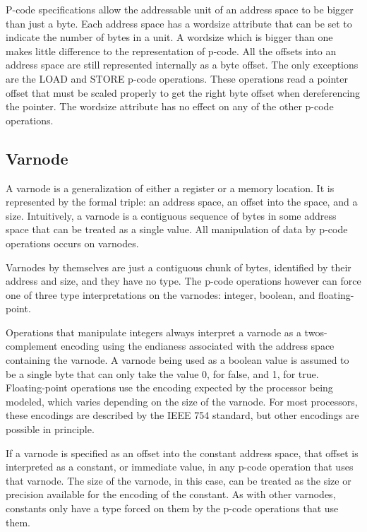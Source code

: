 P-code specifications allow the addressable unit of an address space to be bigger than just a byte. Each address space has a wordsize attribute that can be set to indicate the number of bytes in a unit. A wordsize which is bigger than one makes little difference to the representation of p-code. All the offsets into an address space are still represented internally as a byte offset. The only exceptions are the LOAD and STORE p-code operations. These operations read a pointer offset that must be scaled properly to get the right byte offset when dereferencing the pointer. The wordsize attribute has no effect on any of the other p-code operations. 

\subsection{Varnode}
A varnode is a generalization of either a register or a memory location. It is represented by the formal triple: an address space, an offset into the space, and a size. Intuitively, a varnode is a contiguous sequence of bytes in some address space that can be treated as a single value. All manipulation of data by p-code operations occurs on varnodes.

Varnodes by themselves are just a contiguous chunk of bytes, identified by their address and size, and they have no type. The p-code operations however can force one of three type interpretations on the varnodes: integer, boolean, and floating-point.

Operations that manipulate integers always interpret a varnode as a twos-complement encoding using the endianess associated with the address space containing the varnode.
A varnode being used as a boolean value is assumed to be a single byte that can only take the value 0, for false, and 1, for true.
Floating-point operations use the encoding expected by the processor being modeled, which varies depending on the size of the varnode. For most processors, these encodings are described by the IEEE 754 standard, but other encodings are possible in principle.

If a varnode is specified as an offset into the constant address space, that offset is interpreted as a constant, or immediate value, in any p-code operation that uses that varnode. The size of the varnode, in this case, can be treated as the size or precision available for the encoding of the constant. As with other varnodes, constants only have a type forced on them by the p-code operations that use them. 

